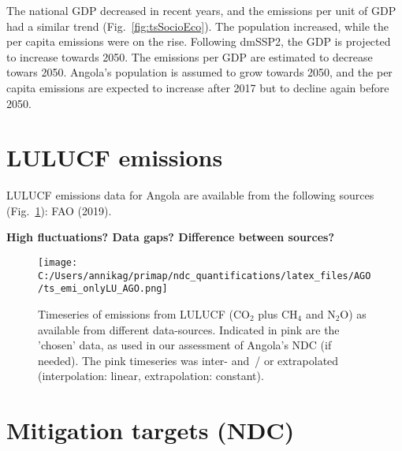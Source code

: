 \documentclass[12pt]{article}
\begin{document}
 The national GDP decreased in recent years, and the emissions per unit of GDP had a similar trend (Fig.~\ref{fig:tsSocioEco}).
 The population increased, while the per capita emissions were on the rise. 
 Following dmSSP2, the GDP is projected to increase towards 2050. 
 The emissions per GDP are estimated to decrease towars 2050. 
 Angola's population is assumed to grow towards 2050, and the per capita emissions are expected to increase after 2017 but to decline again before 2050. 

 \section{LULUCF emissions}
 \label{sec:emiLULUCF}
 LULUCF emissions data for Angola are available from the following sources (Fig.~\ref{fig:tsLULUCF}): FAO (2019).

 \textbf{High fluctuations? Data gaps? Difference between sources?}
 \begin{figure}[htbp]
 \centering
 \texttt{[image: C:/Users/annikag/primap/ndc\_quantifications/latex\_files/AGO/ts\_emi\_onlyLU\_AGO.png]}
 \caption{Timeseries of emissions from LULUCF (CO$_2$ plus CH$_4$ and N$_2$O) as available from different data-sources. 
 Indicated in pink are the 'chosen' data, as used in our assessment of Angola's NDC (if needed). 
 The pink timeseries was inter- and~/ or extrapolated (interpolation: linear, extrapolation: constant).}
 \label{fig:tsLULUCF}
 \end{figure}

 \section{Mitigation targets (NDC)}
 \label{sec:mitiTars}
\end{document}
